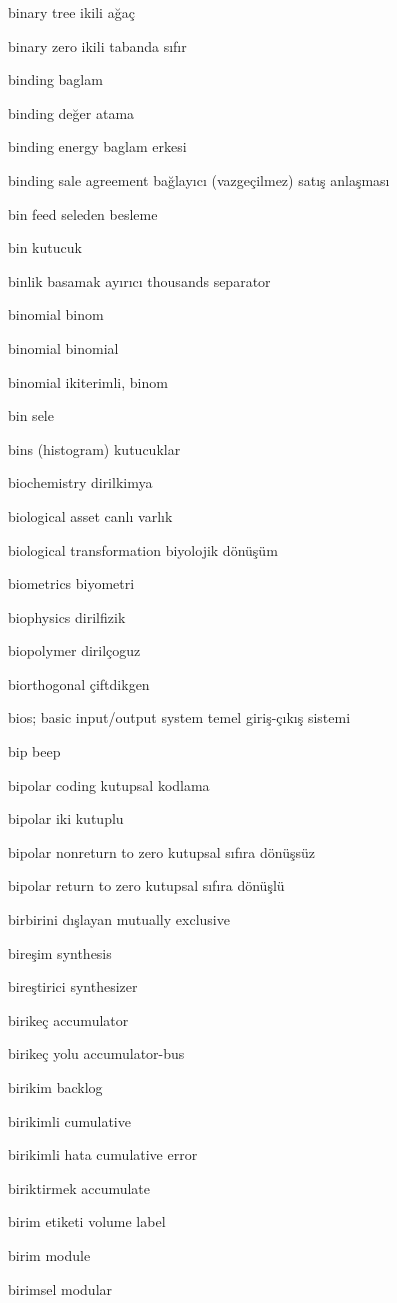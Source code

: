 \documentclass[12pt,fleqn]{article}\usepackage{../../common}
\begin{document}
binary tree ikili ağaç

binary zero ikili tabanda sıfır

binding baglam

binding değer atama

binding energy baglam erkesi

binding sale agreement bağlayıcı (vazgeçilmez) satış anlaşması

bin feed seleden besleme

bin kutucuk

binlik basamak ayırıcı thousands separator

binomial binom

binomial binomial

binomial ikiterimli, binom

bin sele

bins (histogram) kutucuklar

biochemistry dirilkimya

biological asset canlı varlık

biological transformation biyolojik dönüşüm

biometrics biyometri

biophysics dirilfizik

biopolymer dirilçoguz

biorthogonal çiftdikgen

bios; basic input/output system temel giriş-çıkış sistemi

bip beep

bipolar coding kutupsal kodlama

bipolar iki kutuplu

bipolar nonreturn to zero kutupsal sıfıra dönüşsüz

bipolar return to zero kutupsal sıfıra dönüşlü

birbirini dışlayan mutually exclusive

bireşim synthesis

bireştirici synthesizer

birikeç accumulator

birikeç yolu accumulator-bus

birikim backlog

birikimli cumulative

birikimli hata cumulative error

biriktirmek accumulate

birim etiketi volume label

birim module

birimsel modular
\end{document}
